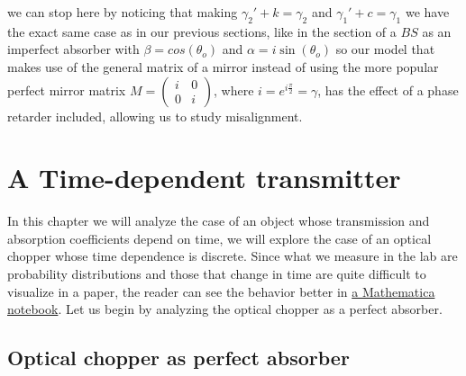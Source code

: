 \documentclass{book}
\begin{document}
we can stop here by noticing that making $\gamma_{2}'+k=\gamma_{2}$ and $\gamma_{1}'+c=\gamma_{1}$ we have the exact same case as in our previous sections, like in the section of a $BS$ as an imperfect absorber with  $\beta=cos(\theta_{o})$ and $\alpha=i\sin(\theta_{o})$ so our model that makes use of the general matrix of a mirror instead of using the more popular perfect mirror matrix $M=\begin{pmatrix} i & 0\\0& i\end{pmatrix}$, where $i=e^{i \frac{\pi}{2}}=\gamma$, has the  effect of a phase retarder included, allowing us to study misalignment.



\pagebreak

\chapter{A Time-dependent transmitter}

In this chapter we will analyze the case of an object whose transmission and absorption coefficients depend on time, we will explore the case of an optical chopper whose time dependence is discrete. Since what we measure in the lab are probability distributions and those that change in time are quite difficult to visualize in a paper, the reader can see the behavior better in \href{https://github.com/mcditoos/Single-Photon-Mach-Zehnder-}{a Mathematica notebook}. Let us begin by analyzing the optical chopper as a perfect absorber.

\section{Optical chopper as perfect absorber }
 
\end{document}
